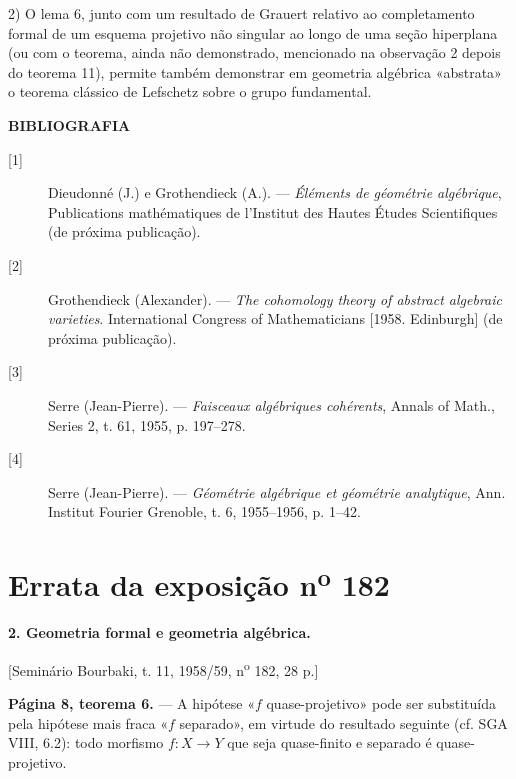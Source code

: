 \documentclass[11pt,twoside,openany]{book}
\numberwithin{equation}{section}
\newcommand{\src}[1]{%
  \phantomsection\hypertarget{src:#1}{}%
  \marginpar{\raggedleft\footnotesize\sffamily #1}%
}
\newcommand{\sid}[1]{\phantomsection\hypertarget{fga:#1}{}}
\theoremstyle{plain}
\theoremstyle{definition}
\theoremstyle{remark}
\newcommand{\FgaUnitKey}{frontmatter}
\renewcommand{\src}[1]{%
  \phantomsection\hypertarget{src:\FgaUnitKey:#1}{}%
  \marginpar{\raggedleft\footnotesize\sffamily #1}%
}
\begin{document}
2) O lema 6, junto com um resultado de Grauert relativo ao completamento
formal de um esquema projetivo não singular ao longo de uma seção
hiperplana (ou com o teorema, ainda não demonstrado, mencionado na
observação 2 depois do teorema 11), permite também demonstrar em geometria
algébrica «abstrata» o teorema clássico de Lefschetz sobre o grupo
fundamental.

\begin{center}
  \textbf{BIBLIOGRAFIA}
\end{center}

\begin{description}
  \item[{[1]}] Dieudonné (J.) e Grothendieck (A.). --- \emph{Éléments de
    géométrie algébrique}, Publications mathématiques de l'Institut des Hautes
    Études Scientifiques (de próxima publicação).
  \item[{[2]}] Grothendieck (Alexander). --- \emph{The cohomology theory of
    abstract algebraic varieties}. International Congress of Mathematicians
    [1958. Edinburgh] (de próxima publicação).
  \item[{[3]}] Serre (Jean-Pierre). --- \emph{Faisceaux algébriques
    cohérents}, Annals of Math., Series 2, t. 61, 1955, p. 197--278.
  \item[{[4]}] Serre (Jean-Pierre). --- \emph{Géométrie algébrique et
    géométrie analytique}, Ann. Institut Fourier Grenoble, t. 6, 1955--1956,
    p. 1--42.
\end{description}

\par

\def\FgaUnitKey{e182}\clearpage
\chapter*{Errata da exposição n\textsuperscript{o} 182}
\setcounter{footnote}{1}
\sid{e182}
\src{298}

\noindent\textbf{2. Geometria formal e geometria algébrica.}

\begin{center}
[Seminário Bourbaki, t. 11, 1958/59, n\textsuperscript{o} 182, 28 p.]
\end{center}

\noindent\textbf{Página 8, teorema 6.} --- A hipótese «$f$
quase-projetivo» pode ser substituída pela hipótese mais fraca «$f$
separado», em virtude do resultado seguinte (cf. SGA VIII, 6.2): todo morfismo
$f:X\longrightarrow Y$ que seja quase-finito e separado é quase-projetivo.
\end{document}
